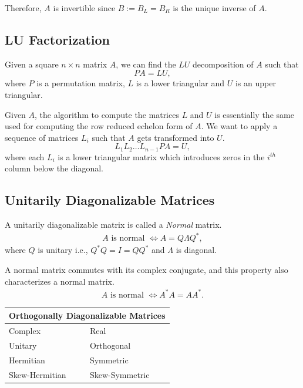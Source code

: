 \documentclass{amsart}
\theoremstyle{plain}
\numberwithin{equation}{section}
\begin{document}
Therefore, $A$ is invertible since $B := B_L = B_R$ is the 
unique inverse of $A$. 



\subsection{LU Factorization}
Given a square $n \times n$ matrix $A$, we can find the $LU$ decomposition 
of $A$ such that 
\begin{equation}
PA = LU,
\label{eq:LU}
\end{equation}
where $P$ is a permutation matrix, $L$ is a lower triangular
and $U$ is an upper triangular.

Given $A$, the algorithm to compute the matrices $L$ and $U$
is essentially the same used for computing the row reduced echelon form of $A$. We want to apply a sequence of matrices $L_i$ such that 
$A$ gets transformed into $U$. 
\begin{equation}
L_1 L_2 \ldots L_{n-1} PA = U,
\label{}
\end{equation}
where each $L_i$ is a lower triangular matrix
which introduces zeros in the $i^{th}$ column
below the diagonal. 

\subsection{Unitarily Diagonalizable Matrices}
A unitarily diagonalizable matrix is called
a \emph{Normal} matrix. 
\begin{align*}
A \text{ is normal } \Leftrightarrow A = Q\Lambda Q^*,
\end{align*}
where $Q$ is unitary i.e., $Q^*Q=I=QQ^*$ and $\Lambda$ is diagonal.

A normal matrix commutes with its complex conjugate, and 
this property also characterizes a normal matrix.
\begin{align*}
A \text{ is normal } \Leftrightarrow A^*A = AA^*.
\end{align*}

\begin{center}
\begin{tabular}{ |p{3cm}|p{3cm}| }
 \hline
 \multicolumn{2}{|c|}{ Orthogonally Diagonalizable Matrices }\\
 \hline
 Complex & Real \\
 \hline
 Unitary  & Orthogonal\\
 Hermitian & Symmetric\\
 Skew-Hermitian & Skew-Symmetric \\
 \hline
\end{tabular}
\end{center}
\end{document}
